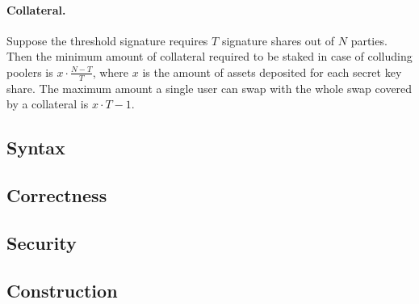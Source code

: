 \paragraph*{Collateral.}
Suppose the threshold signature requires $T$ signature shares out of $N$ parties. Then the minimum amount of collateral required to be staked in case of colluding poolers is $x \cdot \frac{N-T}{T}$, where $x$ is the amount of assets deposited for each secret key share.
The maximum amount a single user can swap with the whole swap covered by a collateral is $x \cdot T-1$.
\subsection{Syntax}
\subsection{Correctness}
\subsection{Security}
\subsection{Construction}

\newpage 
